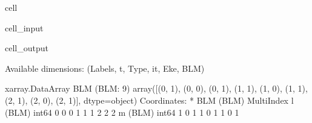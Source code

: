 \documentclass[letterpaper,table,10pt,english]{jupyterBook}
\begin{document}
\begin{sphinxuseclass}{cell}\begin{sphinxVerbatimInput}

\begin{sphinxuseclass}{cell_input}
\begin{sphinxVerbatim}[commandchars=\\\{\}]


\end{sphinxVerbatim}

\end{sphinxuseclass}\end{sphinxVerbatimInput}
\begin{sphinxVerbatimOutput}

\begin{sphinxuseclass}{cell_output}
\begin{sphinxVerbatim}[commandchars=\\\{\}]
Available dimensions: (\PYGZsq{}Labels\PYGZsq{}, \PYGZsq{}t\PYGZsq{}, \PYGZsq{}Type\PYGZsq{}, \PYGZsq{}it\PYGZsq{}, \PYGZsq{}Eke\PYGZsq{}, \PYGZsq{}BLM\PYGZsq{})
\end{sphinxVerbatim}

\begin{sphinxVerbatim}[commandchars=\\\{\}]
\PYGZlt{}xarray.DataArray \PYGZsq{}BLM\PYGZsq{} (BLM: 9)\PYGZgt{}
array([(0, \PYGZhy{}1), (0, 0), (0, 1), (1, \PYGZhy{}1), (1, 0), (1, 1), (2, \PYGZhy{}1), (2, 0),
       (2, 1)], dtype=object)
Coordinates:
  * BLM      (BLM) MultiIndex
  \PYGZhy{} l        (BLM) int64 0 0 0 1 1 1 2 2 2
  \PYGZhy{} m        (BLM) int64 \PYGZhy{}1 0 1 \PYGZhy{}1 0 1 \PYGZhy{}1 0 1
\end{sphinxVerbatim}

\end{sphinxuseclass}\end{sphinxVerbatimOutput}

\end{sphinxuseclass}
\end{document}

